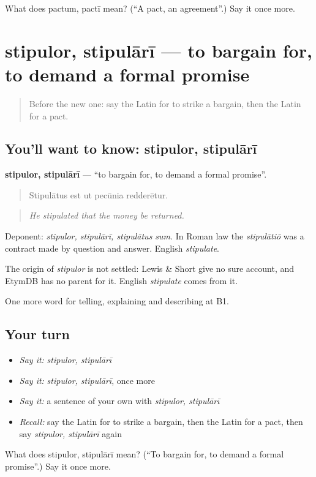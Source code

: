 \begin{tcolorbox}[breakable,colback=teal!4,colframe=teal!35!black,title={Before you move on}]
What does pactum, pactī mean? (\textquotedblleft{}A pact, an agreement\textquotedblright{}.) Say it once more.
\end{tcolorbox}
\section[stipulor, stipulārī]{stipulor, stipulārī — to bargain for, to demand a formal promise}

\label{lesson:LA-C397-stipulor}



\begin{quote}
Before the new one: say the Latin for to strike a bargain, then the Latin for a pact.
\end{quote}

\subsection*{You'll want to know: stipulor, stipulārī}
\textbf{stipulor, stipulārī} — \textquotedblleft{}to bargain for, to demand a formal promise\textquotedblright{}.

\begin{quote}
Stipulātus est ut pecūnia redderētur.
\end{quote}

\begin{quote}
\emph{He stipulated that the money be returned.}
\end{quote}

Deponent: \emph{stipulor, stipulārī, stipulātus sum}. In Roman law the \emph{stipulātiō} was a contract made by question and answer. English \emph{stipulate}.

\begin{cousinweb}
The origin of \emph{stipulor} is not settled: Lewis \& Short give no sure account, and EtymDB has no parent for it. English \emph{stipulate} comes from it.
\end{cousinweb}

\begin{grammarlens}[title={What you've built}]
One more word for telling, explaining and describing at B1.
\end{grammarlens}

\subsection*{Your turn}
\begin{itemize}
\raggedright
  \item \emph{Say it:} \emph{stipulor, stipulārī}
  \item \emph{Say it:} \emph{stipulor, stipulārī}, once more
  \item \emph{Say it:} a sentence of your own with \emph{stipulor, stipulārī}
  \item \emph{Recall:} say the Latin for to strike a bargain, then the Latin for a pact, then say \emph{stipulor, stipulārī} again
\end{itemize}

\begin{tcolorbox}[breakable,colback=teal!4,colframe=teal!35!black,title={Before you move on}]
What does stipulor, stipulārī mean? (\textquotedblleft{}To bargain for, to demand a formal promise\textquotedblright{}.) Say it once more.
\end{tcolorbox}
